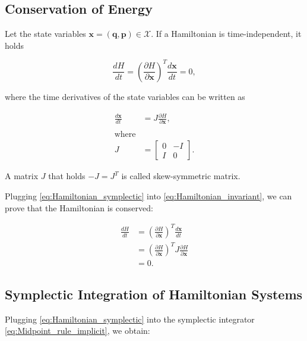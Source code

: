 \documentclass[
	parskip, 			   %
	twoside, 			   %
	DIV=14, 			   %
	BCOR=15.0mm, 		   %
	headsepline, 		   %
	open=right, 		   %
	captions=tableheading, %
	bibliography=totoc,    %
	numbers=noenddot       %
]{scrreprt}
\begin{document}
\subsection{Conservation of Energy}
Let the state variables $\mathbf{x}=(\mathbf{q},\mathbf{p}) \in \mathcal{X}$. If a Hamiltonian is time-independent, it holds

\begin{equation}
    \label{eq:Hamiltonian_invariant}
    \frac{dH}{dt} = \left(\frac{\partial H}{\partial \mathbf{x}}\right)^T \frac{d\mathbf{x}}{dt} = 0,
\end{equation}

where the time derivatives of the state variables can be written as

\begin{equation}
    \label{eq:Hamiltonian_symplectic}
    \begin{aligned}
        \frac{d\mathbf{x}}{dt} &= J \frac{\partial H}{\partial \mathbf{x}},\\\\
        \text{where}\\
        J &= \left[ \begin{array}{cc}
            0 & -I \\
            I & 0
        \end{array} \right].
    \end{aligned}
\end{equation}

A matrix $J$ that holds $-J = J^T$ is called skew-symmetric matrix.

Plugging \ref{eq:Hamiltonian_symplectic} into \ref{eq:Hamiltonian_invariant}, we can prove that the Hamiltonian is conserved:

\begin{equation}
    \label{eq:Hamiltonian_symplectic_conclusion}
    \begin{aligned}
        \frac{dH}{dt} &= \left(\frac{\partial H}{\partial \mathbf{x}}\right)^T \frac{d\mathbf{x}}{dt}\\
         &= \left(\frac{\partial H}{\partial \mathbf{x}}\right)^T J \frac{\partial H}{\partial \mathbf{x}} \\
         &= 0.
    \end{aligned}
\end{equation}

\subsection{Symplectic Integration of Hamiltonian Systems}
Plugging \ref{eq:Hamiltonian_symplectic} into the symplectic integrator \ref{eq:Midpoint_rule_implicit}, we obtain:
\end{document}
